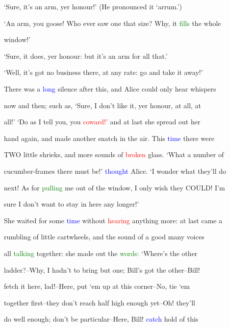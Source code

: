  ‘Sure, it’s an arm, yer honour!’ (He pronounced it ‘arrum.’)



 ‘An arm, you goose! Who ever saw one that size? Why, it \textcolor{green}{fills} the whole

 window!’



 ‘Sure, it does, yer honour: but it’s an arm for all that.’



 ‘Well, it’s got no business there, at any rate: go and take it away!’



 There was a \textcolor{blue}{long} silence after this, and Alice could only hear whispers

 now and then; such as, ‘Sure, I don’t like it, yer honour, at all, at

 all!’ ‘Do as I tell you, you \textcolor{red}{coward!’} and at last she spread out her

 hand again, and made another snatch in the air. This \textcolor{blue}{time} there were

 TWO little \textcolor{BurntOrange}{shrieks,} and more sounds of \textcolor{red}{broken} glass. ‘What a number of

 cucumber-frames there must be!’ \textcolor{blue}{thought} Alice. ‘I wonder what they’ll do

 next! As for \textcolor{green}{pulling} me out of the window, I only wish they COULD! I’m

 sure I don’t want to stay in here any longer!’



 She \textcolor{BurntOrange}{waited} for some \textcolor{blue}{time} without \textcolor{red}{hearing} anything more: at last came a

 rumbling of little cartwheels, and the sound of a \textcolor{BurntOrange}{good} many voices

 all \textcolor{green}{talking} together: she made out the \textcolor{green}{words:} ‘Where’s the other

 ladder?--Why, I hadn’t to bring but one; Bill’s got the other--Bill!

 fetch it here, lad!--Here, put ‘em up at this corner--No, tie ‘em

 together first--they don’t reach half high enough yet--Oh! they’ll

 do well enough; don’t be particular--Here, Bill! \textcolor{blue}{catch} hold of this

